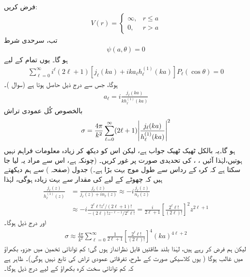  فرض کریں:
\begin{align}
	V(r)=
	\begin{cases}
		\infty, & r\leq a \\
		0, & r>a 
	\end{cases}
\end{align}
تب، سرحدی شرط 
\begin{align}
	\psi(a, \theta) = 0
\end{align}
ہو گا۔ یوں تمام  کے لیے
\begin{align}\label{مساوات_بکھراو_اے_ایل_الف}
	\sum_{\ell=0}^{\infty}i^{\ell}(2\ell+1)\left[j_{\ell}(ka)+ika_{\ell}h_{\ell}^{(1)}(ka)\right]P_{\ell}(\cos\theta) = 0
\end{align}
ہوگا، جس سے درج ذیل حاصل ہوتا ہے (سوال )۔
\begin{align}\label{مساوات_بکھراو_اے_ایل_ب}
	a_{\ell} = i\frac{j_{\ell}(ka)}{kh_{\ell}^{(1)}(ka)}
\end{align}
بالخصوص کُل عمودی تراش
\begin{align}
	\sigma=\frac{4\pi}{k^2}\sum_{\ell=0}^{\infty}(2\ell+1)\abs{\frac{j_{\ell}(ka)}{h_{\ell}^{(1)}(ka)}}^2
\end{align}
ہو گا۔یہ بالکل ٹھیک ٹھیک جواب ہے، لیکن اس کو دیکھ کر زیادہ معلومات فراہم نہیں ہوتیں،لہٰذا آئیں ، ، کی تحدیدی صورت پر غور کریں۔ (چونکہ  ہے، اس سے مراد یہ لیا جا سکتا ہے کہ کرہ کے رداس سے طول موج بہت بڑا ہے۔) جدول  (صفحہ ) سے ہم دیکھتے ہیں کہ چھوٹے  کے لیے  کی مقدار  سے بہت زیادہ ہوگی، لہٰذا 
\begin{align}
	\frac{j_{\ell}(z)}{h_{\ell}^{(1)}(z)} &= \frac{j_{\ell}(z)}{j_{\ell}(z)+in_{\ell}(z)}\approx-i\frac{j_{\ell}(z)}{n_{\ell}(z)}\nonumber \\
	&\approx-i\frac{2^{\ell}\ell!z^{\ell}/(2\ell+1)!}{-(2\ell)!z^{-\ell-1}/2^{\ell}\ell!} = \frac{i}{2\ell+1}\left[\frac{2^{\ell}\ell!}{(2\ell)!}\right]^2z^{2\ell+1}
\end{align}
اور درج ذیل ہوگا۔
\begin{align*}
	\sigma\approx\frac{4\pi}{k^2}\sum_{\ell=0}^{\infty}\frac{1}{2\ell+1}\left[\frac{2^{\ell}\ell!}{(2\ell)!}\right]^4(ka)^{4\ell+2}
\end{align*}
لیکن ہم  فرض کر رہے ہیں، لہٰذا بلند طاقتیں قابل نظرانداز ہوں گی؛ کم توانائی تخمین میں  جزو، بکھراؤ میں غالب ہوگا ( یوں کلاسیکی صورت کے طرح، تفرقاتی عمودی تراش  کی تابع نہیں ہوگی)۔ ظاہر ہے کہ کم توانائی سخت کرہ بکھراؤ کے لیے درج ذیل ہوگا۔
